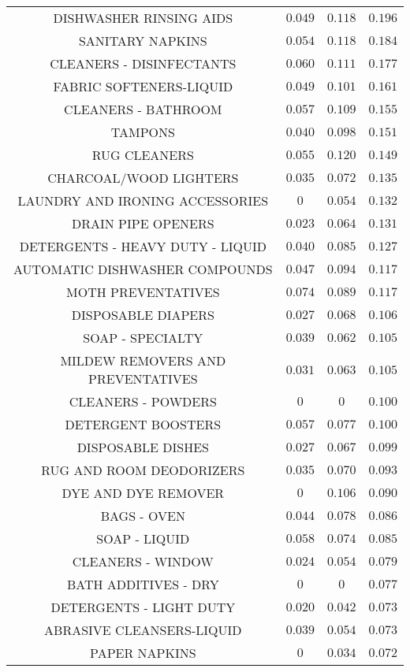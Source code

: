\begin{table}[!htbp]
{\begin{tabular}{@{\extracolsep{5pt}} cccc}
DISHWASHER RINSING AIDS & $0.049$ & $0.118$ & $0.196$ \\
SANITARY NAPKINS & $0.054$ & $0.118$ & $0.184$ \\
CLEANERS - DISINFECTANTS & $0.060$ & $0.111$ & $0.177$ \\
FABRIC SOFTENERS-LIQUID & $0.049$ & $0.101$ & $0.161$ \\
CLEANERS - BATHROOM & $0.057$ & $0.109$ & $0.155$ \\
TAMPONS & $0.040$ & $0.098$ & $0.151$ \\
RUG CLEANERS & $0.055$ & $0.120$ & $0.149$ \\
CHARCOAL/WOOD LIGHTERS & $0.035$ & $0.072$ & $0.135$ \\
LAUNDRY AND IRONING ACCESSORIES & $0$ & $0.054$ & $0.132$ \\
DRAIN PIPE OPENERS & $0.023$ & $0.064$ & $0.131$ \\
DETERGENTS - HEAVY DUTY - LIQUID & $0.040$ & $0.085$ & $0.127$ \\
AUTOMATIC DISHWASHER COMPOUNDS & $0.047$ & $0.094$ & $0.117$ \\
MOTH PREVENTATIVES & $0.074$ & $0.089$ & $0.117$ \\
DISPOSABLE DIAPERS & $0.027$ & $0.068$ & $0.106$ \\
SOAP - SPECIALTY & $0.039$ & $0.062$ & $0.105$ \\
MILDEW REMOVERS AND PREVENTATIVES & $0.031$ & $0.063$ & $0.105$ \\
CLEANERS - POWDERS & $0$ & $0$ & $0.100$ \\
DETERGENT BOOSTERS & $0.057$ & $0.077$ & $0.100$ \\
DISPOSABLE DISHES & $0.027$ & $0.067$ & $0.099$ \\
RUG AND ROOM DEODORIZERS & $0.035$ & $0.070$ & $0.093$ \\
DYE AND DYE REMOVER & $0$ & $0.106$ & $0.090$ \\
BAGS - OVEN & $0.044$ & $0.078$ & $0.086$ \\
SOAP - LIQUID & $0.058$ & $0.074$ & $0.085$ \\
CLEANERS - WINDOW & $0.024$ & $0.054$ & $0.079$ \\
BATH ADDITIVES - DRY & $0$ & $0$ & $0.077$ \\
DETERGENTS - LIGHT DUTY & $0.020$ & $0.042$ & $0.073$ \\
ABRASIVE CLEANSERS-LIQUID & $0.039$ & $0.054$ & $0.073$ \\
PAPER NAPKINS & $0$ & $0.034$ & $0.072$ \\

\end{tabular}}
\end{table}
